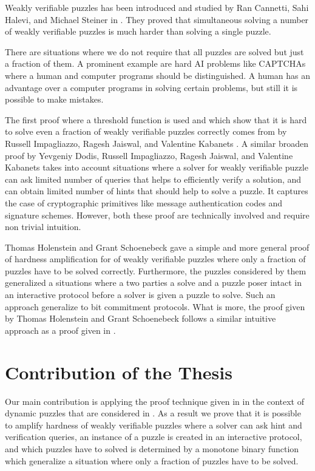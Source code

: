 \documentclass[11pt,a4paper,titlepage]{memoir}
\begin{document}
Weakly verifiable puzzles has been introduced and studied by Ran Cannetti, Sahi Halevi, and Michael Steiner in \cite{canetti2004hardness}.
They proved that simultaneous solving a number of weakly verifiable puzzles is much harder than solving a single puzzle.

There are situations where we do not require that all puzzles are solved but just a fraction of them.
A prominent example are hard AI problems like CAPTCHAs where a human and computer programs should be distinguished.
A human has an advantage over a computer programs in solving certain problems, but still it is possible to make mistakes.

The first proof where a threshold function is used and which show that it is hard to solve even a fraction of weakly
verifiable puzzles correctly comes from by Russell Impagliazzo, Ragesh Jaiswal, and Valentine Kabanets \cite{impagliazzo2007chernoff}.
A similar broaden proof by Yevgeniy Dodis, Russell Impagliazzo, Ragesh Jaiswal, and Valentine Kabanets \cite{Dodis:2009:SAI:1530441.1530450}
takes into account situations where a solver for weakly verifiable puzzle can ask limited number of queries
that helps to efficiently verify a solution, and can obtain limited number of hints that should help to solve a puzzle.
It captures the case of cryptographic primitives like message authentication codes and signature schemes.
However, both these proof are technically involved and require non trivial intuition.

Thomas Holenstein and Grant Schoenebeck \cite{DBLP:journals/corr/abs-1002-3534} gave a simple and more general proof of hardness amplification for of weakly verifiable puzzles
where only a fraction of puzzles have to be solved correctly.
Furthermore, the puzzles considered by them generalized a situations where a two parties a solve and a puzzle poser intact in an interactive protocol before
a solver is given a puzzle to solve. Such an approach generalize to bit commitment protocols.
What is more, the proof given by Thomas Holenstein and Grant Schoenebeck follows a similar intuitive approach as a proof given in \cite{canetti2004hardness}.

\section{Contribution of the Thesis}
Our main contribution is applying the proof technique given in \cite{DBLP:journals/corr/abs-1002-3534}
in the context of dynamic puzzles that are considered in \cite{Dodis:2009:SAI:1530441.1530450}.
As a result we prove that it is possible to amplify hardness of weakly verifiable puzzles where a solver
can ask hint and verification queries, an instance of a puzzle is created in an interactive protocol, and
which puzzles have to solved is determined by a monotone binary function which generalize a situation where only
a fraction of puzzles have to be solved.
\end{document}
